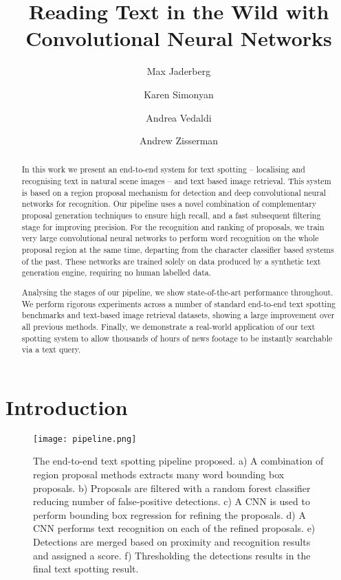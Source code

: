 \documentclass[twocolumn]{svjour3}          \smartqed  \usepackage{epsfig}
\begin{document}
\title{Reading Text in the Wild with Convolutional Neural Networks}


\author{Max Jaderberg \and Karen Simonyan \and Andrea Vedaldi \and Andrew Zisserman }



\date{}



\maketitle

\begin{abstract}
In this work we present an end-to-end system for text spotting -- localising and recognising text in natural scene images -- and text based image retrieval. This system is based on a region proposal mechanism for detection and deep convolutional neural networks for recognition. Our pipeline uses a novel combination of complementary proposal generation techniques to ensure high recall, and a fast subsequent filtering stage for improving precision. For the recognition and ranking of proposals, we train very large convolutional neural networks to perform word recognition on the whole proposal region at the same time, departing from the character classifier based systems of the past. These networks are trained solely on data produced by a synthetic text generation engine, requiring no human labelled data. 

Analysing the stages of our pipeline, we show state-of-the-art performance throughout. We perform rigorous experiments across a number of standard end-to-end text spotting benchmarks and text-based image retrieval datasets, showing a large improvement over all previous methods. Finally, we demonstrate a real-world application of our text spotting system to allow thousands of hours of news footage to be instantly searchable via a text query.
\end{abstract}


\section{Introduction}
\label{sec:intro}

\begin{figure*}[t]
\centering
\texttt{[image: pipeline.png]}
\caption{The end-to-end text spotting pipeline proposed. a) A combination of region proposal methods extracts many word bounding box proposals. b) Proposals are filtered with a random forest classifier reducing number of false-positive detections. c) A CNN is used to perform bounding box regression for refining the proposals. d) A CNN performs text recognition on each of the refined proposals. e) Detections are merged based on proximity and recognition results and assigned a score. f) Thresholding the detections results in the final text spotting result.}
\label{fig:pipeline}
\end{figure*}
\end{document}
